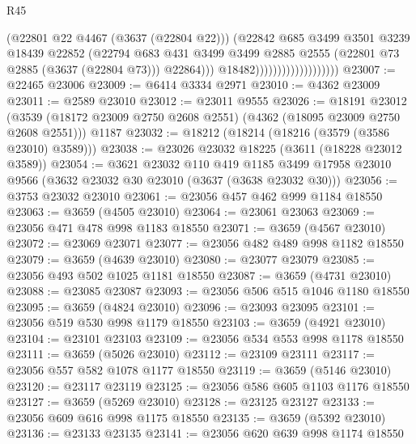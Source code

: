 \begin{lexlean}{R45}
\begin{coremodule}
                                            (@22801 @22 @4467 (@3637 (@22804 @22)))
                                            (@22842
                                              @685
                                              @3499
                                              @3501
                                              @3239
                                              @18439
                                              @22852
                                              (@22794
                                                @683
                                                @431
                                                @3499
                                                @3499
                                                @2885
                                                @2555
                                                (@22801 @73 @2885 (@3637 (@22804 @73)))
                                                @22864)))
                                          @18482)))))))))))))))))))
@23007 := @22465 @23006
@23009 := @6414 @3334 @2971
@23010 := @4362 @23009
@23011 := @2589 @23010
@23012 := @23011 @9555
@23026 := @18191
    @23012
    (@3539 (@18172 @23009 @2750 @2608 @2551) (@4362 (@18095 @23009 @2750 @2608 @2551)))
    @1187
@23032 := @18212 (@18214 (@18216 (@3579 (@3586 @23010) @3589)))
@23038 := @23026 @23032 @18225 (@3611 (@18228 @23012 @3589))
@23054 := @3621
    @23032
    @110
    @419
    @1185
    @3499
    @17958
    @23010
    @9566
    (@3632 @23032 @30 @23010 (@3637 (@3638 @23032 @30)))
@23056 := @3753 @23032 @23010
@23061 := @23056 @457 @462 @999 @1184 @18550
@23063 := @3659 (@4505 @23010)
@23064 := @23061 @23063
@23069 := @23056 @471 @478 @998 @1183 @18550
@23071 := @3659 (@4567 @23010)
@23072 := @23069 @23071
@23077 := @23056 @482 @489 @998 @1182 @18550
@23079 := @3659 (@4639 @23010)
@23080 := @23077 @23079
@23085 := @23056 @493 @502 @1025 @1181 @18550
@23087 := @3659 (@4731 @23010)
@23088 := @23085 @23087
@23093 := @23056 @506 @515 @1046 @1180 @18550
@23095 := @3659 (@4824 @23010)
@23096 := @23093 @23095
@23101 := @23056 @519 @530 @998 @1179 @18550
@23103 := @3659 (@4921 @23010)
@23104 := @23101 @23103
@23109 := @23056 @534 @553 @998 @1178 @18550
@23111 := @3659 (@5026 @23010)
@23112 := @23109 @23111
@23117 := @23056 @557 @582 @1078 @1177 @18550
@23119 := @3659 (@5146 @23010)
@23120 := @23117 @23119
@23125 := @23056 @586 @605 @1103 @1176 @18550
@23127 := @3659 (@5269 @23010)
@23128 := @23125 @23127
@23133 := @23056 @609 @616 @998 @1175 @18550
@23135 := @3659 (@5392 @23010)
@23136 := @23133 @23135
@23141 := @23056 @620 @639 @998 @1174 @18550

\end{coremodule}
\end{lexlean}
